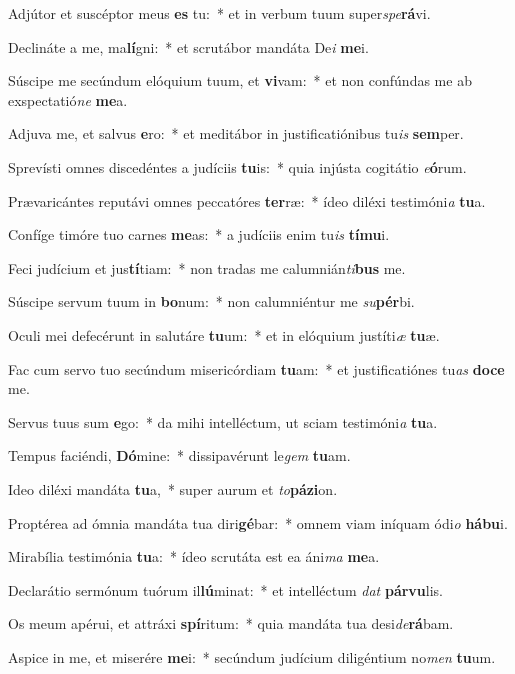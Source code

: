 \item Adjútor et suscéptor meus \textbf{es} tu:~* et in verbum tuum super\textit{spe}\textbf{rá}vi.
\item Declináte a me, ma\textbf{lí}gni:~* et scrutábor mandáta De\textit{i} \textbf{me}i.
\item Súscipe me secúndum elóquium tuum, et \textbf{vi}vam:~* et non confúndas me ab exspectatió\textit{ne} \textbf{me}a.
\item Adjuva me, et salvus \textbf{e}ro:~* et meditábor in justificatiónibus tu\textit{is} \textbf{sem}per.
\item Sprevísti omnes discedéntes a judíciis \textbf{tu}is:~* quia injústa cogitátio \textit{e}\textbf{ó}rum.
\item Prævaricántes reputávi omnes peccatóres \textbf{ter}ræ:~* ídeo diléxi testimóni\textit{a} \textbf{tu}a.
\item Confíge timóre tuo carnes \textbf{me}as:~* a judíciis enim tu\textit{is} \textbf{tí}\textbf{mu}i.
\item Feci judícium et jus\textbf{tí}tiam:~* non tradas me calumnián\textit{ti}\textbf{bus} me.
\item Súscipe servum tuum in \textbf{bo}num:~* non calumniéntur me \textit{su}\textbf{pér}bi.
\item Oculi mei defecérunt in salutáre \textbf{tu}um:~* et in elóquium justíti\textit{æ} \textbf{tu}æ.
\item Fac cum servo tuo secúndum misericórdiam \textbf{tu}am:~* et justificatiónes tu\textit{as} \textbf{do}\textbf{ce} me.
\item Servus tuus sum \textbf{e}go:~* da mihi intelléctum, ut sciam testimóni\textit{a} \textbf{tu}a.
\item Tempus faciéndi, \textbf{Dó}mine:~* dissipavérunt le\textit{gem} \textbf{tu}am.
\item Ideo diléxi mandáta \textbf{tu}a,~* super aurum et \textit{to}\textbf{pá}\textbf{zi}on.
\item Proptérea ad ómnia mandáta tua diri\textbf{gé}bar:~* omnem viam iníquam ódi\textit{o} \textbf{há}\textbf{bu}i.
\item Mirabília testimónia \textbf{tu}a:~* ídeo scrutáta est ea áni\textit{ma} \textbf{me}a.
\item Declarátio sermónum tuórum il\textbf{lú}minat:~* et intelléctum \textit{dat} \textbf{pár}\textbf{vu}lis.
\item Os meum apérui, et attráxi \textbf{spí}ritum:~* quia mandáta tua desi\textit{de}\textbf{rá}bam.
\item Aspice in me, et miserére \textbf{me}i:~* secúndum judícium diligéntium no\textit{men} \textbf{tu}um.
